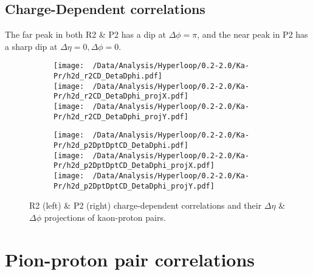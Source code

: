 \documentclass[12pt,a4paper,twoside]{report}
\begin{document}
\subsection{Charge-Dependent correlations}
The far peak in both R2 \&  P2 has a dip at $\Delta\phi=\pi$, and the near peak in P2 has a sharp dip at $\Delta\eta=0,\Delta\phi=0$.
\begin{figure}[H]
	\begin{subfigure}{0.49\linewidth}
		\texttt{[image: ~/Data/Analysis/Hyperloop/0.2-2.0/Ka-Pr/h2d\_r2CD\_DetaDphi.pdf]}\\
		\texttt{[image: ~/Data/Analysis/Hyperloop/0.2-2.0/Ka-Pr/h2d\_r2CD\_DetaDphi\_projX.pdf]}\\
		\texttt{[image: ~/Data/Analysis/Hyperloop/0.2-2.0/Ka-Pr/h2d\_r2CD\_DetaDphi\_projY.pdf]}\\
	\end{subfigure}
	\begin{subfigure}{0.49\linewidth}
		\texttt{[image: ~/Data/Analysis/Hyperloop/0.2-2.0/Ka-Pr/h2d\_p2DptDptCD\_DetaDphi.pdf]}\\
		\texttt{[image: ~/Data/Analysis/Hyperloop/0.2-2.0/Ka-Pr/h2d\_p2DptDptCD\_DetaDphi\_projX.pdf]}\\
		\texttt{[image: ~/Data/Analysis/Hyperloop/0.2-2.0/Ka-Pr/h2d\_p2DptDptCD\_DetaDphi\_projY.pdf]}\\
	\end{subfigure}
	\caption{R2 (left) \& P2 (right) charge-dependent correlations and their $\Delta\eta$ \& $\Delta\phi$ projections of kaon-proton pairs.}
\end{figure}
\section{Pion-proton pair correlations}
\end{document}
